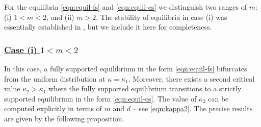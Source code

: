 \documentclass[11pt]{amsart}
\newcommand{\dm}{d} %
\begin{document}
For the equilibria \eqref{eqn:equil-fs} and \eqref{eqn:equil-cs} we distinguish two ranges of $m$: (i) $1<m<2$, and (ii) $m>2$. The stability of equilibria in case (i) was essentially established in \cite{FePaVa2025}, but we include it here for completeness.

\subsubsection{\underline{Case (i) $1<m<2$}}
\label{subsubsect:prelim:ml2}
In this case, a fully supported equilibrium in the form \eqref{eqn:equil-fs} bifurcates from the uniform distribution at $\kappa=\kappa_1$.  Moreover, there exists a second critical value $\kappa_2>\kappa_1$ where the fully supported equilibrium transitions to a strictly supported equilibrium in the form \eqref{eqn:equil-cs}. The value of $\kappa_2$ can be computed explicitly in terms of $m$ and $\dm$ \cite{FePaVa2025} -- see \eqref{eqn:kappa2}. The precise results are given by the following proposition. 
\end{document}
